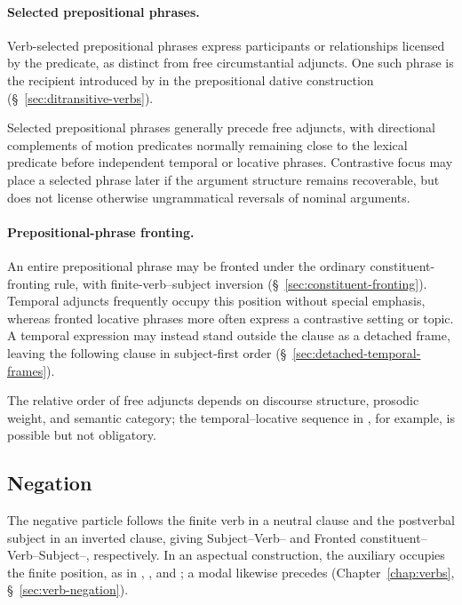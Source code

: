 \paragraph{Selected prepositional phrases.}

Verb-selected prepositional phrases express participants or relationships licensed by the predicate, as distinct from free circumstantial adjuncts. One such phrase is the recipient introduced by  in the prepositional dative construction (\S~\ref{sec:ditransitive-verbs}).

Selected prepositional phrases generally precede free adjuncts, with directional complements of motion predicates normally remaining close to the lexical predicate before independent temporal or locative phrases. Contrastive focus may place a selected phrase later if the argument structure remains recoverable, but does not license otherwise ungrammatical reversals of nominal arguments.

\paragraph{Prepositional-phrase fronting.}

An entire prepositional phrase may be fronted under the ordinary constituent-fronting rule, with finite-verb--subject inversion (\S~\ref{sec:constituent-fronting}). Temporal adjuncts frequently occupy this position without special emphasis, whereas fronted locative phrases more often express a contrastive setting or topic. A temporal expression may instead stand outside the clause as a detached frame, leaving the following clause in subject-first order (\S~\ref{sec:detached-temporal-frames}).

The relative order of free adjuncts depends on discourse structure, prosodic weight, and semantic category; the temporal--locative sequence in , for example, is possible but not obligatory.

\subsection{Negation}
\label{sec:clausal-negation}

The negative particle  follows the finite verb in a neutral clause and the postverbal subject in an inverted clause, giving Subject--Verb-- and Fronted constituent--Verb--Subject--, respectively. In an aspectual construction, the auxiliary occupies the finite position, as in , , and ; a modal likewise precedes  (Chapter~\ref{chap:verbs}, \S~\ref{sec:verb-negation}).

